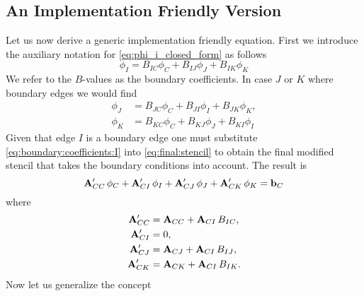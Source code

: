 \documentclass[preprint,nocopyrightspace]{sigplanconf}
\begin{document}
\subsection{An Implementation Friendly Version}
\label{sec:implementation}
Let us now derive a generic implementation friendly equation. First we
introduce the auxiliary notation for \eqref{eq:phi_i_closed_form} as
follows
\begin{equation}
  \label{eq:boundary:coefficients:I}
  \phi_I = B_{IC} \phi_C +B_{IJ} \phi_J +B_{IK} \phi_K
\end{equation}
We refer to the $B$-values as the boundary coefficients. In case $J$
or $K$ where boundary edges we would find
\begin{subequations}
\begin{align}
  \phi_J &= B_{JC} \phi_C +B_{JI} \phi_I +B_{JK} \phi_K,   \label{eq:boundary:coefficients:J}\\
  \phi_K &= B_{KC} \phi_C +B_{KJ} \phi_J +B_{KI} \phi_I
  \label{eq:boundary:coefficients:K}
\end{align}  
\end{subequations}
Given that edge $I$ is a boundary edge one must substitute
\eqref{eq:boundary:coefficients:I} into \eqref{eq:final:stencil} to
obtain the final modified stencil that takes the boundary conditions
into account. The result is
\begin{equation}
  \label{eq:final:stencil:modified}
  \mathbf{A} ^\prime_{CC}\, \phi_C + \mathbf{A} ^\prime_{CI} \,\phi_I + \mathbf{A} ^\prime_{CJ}\, \phi_J + \mathbf{A} ^\prime_{CK} \,\phi_K
  =  
  \mathbf{b} _C
\end{equation}
where
\begin{subequations}
  \begin{align}
    \mathbf{A} ^\prime_{CC} &= \mathbf{A} _{CC}  + \mathbf{A} _{CI} \, B_{IC}, \\
    \mathbf{A} ^\prime_{CI} &= 0, \\
    \mathbf{A} ^\prime_{CJ} &= \mathbf{A} _{CJ}  + \mathbf{A} _{CI} \,  B_{IJ}, \\
    \mathbf{A} ^\prime_{CK} &= \mathbf{A} _{CK}  + \mathbf{A} _{CI} \,  B_{IK}.
  \end{align}  
\end{subequations}
 Now let us generalize the concept
\end{document}
